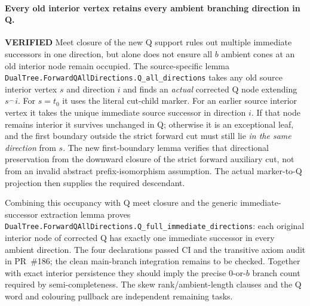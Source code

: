 \documentclass[11pt]{article}
\newcommand{\ok}{\textcolor{green!40!black}{\textbf{VERIFIED}}}
\newcommand{\lean}[1]{\texttt{#1}}
\begin{document}
\paragraph{Every old interior vertex retains every ambient branching direction in Q.} \ok
Meet closure of the new Q support rules out multiple immediate
successors in one direction, but alone does not ensure all
$b$ ambient cones at an old interior node remain occupied.
The source-specific lemma
\lean{DualTree.ForwardQAllDirections.Q_all_directions}
takes any old source interior vertex $s$ and direction
$i$ and finds an \emph{actual} corrected Q node extending
$s^\frown i$. For $s=t_0$ it uses the literal cut-child
marker. For an earlier source interior vertex it takes
the unique immediate source successor in direction $i$.
If that node remains interior it survives unchanged in Q;
otherwise it is an exceptional leaf, and the first boundary
outside the strict forward cut must still lie \emph{in the
same direction} from $s$. The new first-boundary lemma
verifies that directional preservation from the downward
closure of the strict forward auxiliary cut, not from an
invalid abstract prefix-isomorphism assumption.
The actual marker-to-Q projection then supplies the
required descendant.

Combining this occupancy with Q meet closure and the
generic immediate-successor extraction lemma proves
\lean{DualTree.ForwardQAllDirections.Q_full_immediate_directions}:
each original interior node of corrected Q has exactly
one immediate successor in every ambient direction.
The four declarations passed CI and the transitive axiom audit
in PR~\#186; the clean main-branch integration remains to be checked. Together with exact interior
persistence they should imply the precise $0$-or-$b$
branch count required by semi-completeness.
The skew rank/ambient-length clauses and the Q word
and colouring pullback are independent remaining tasks.
\end{document}
